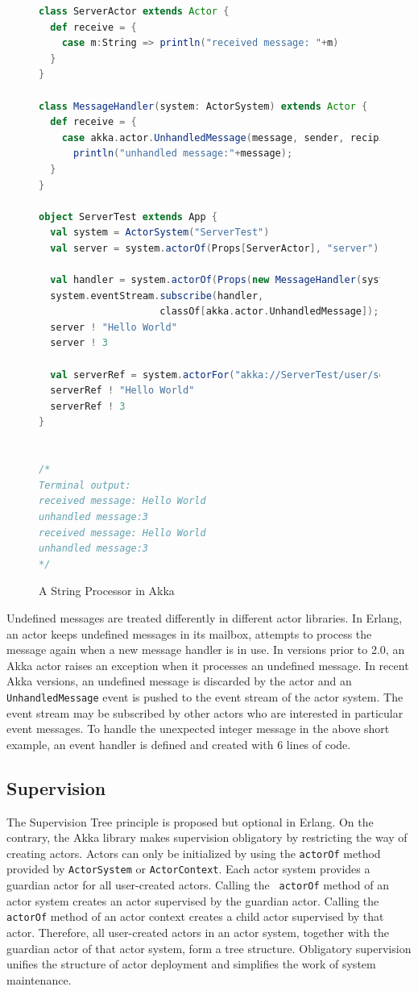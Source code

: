 \begin{figure}[p]
 \label{akkastring}
      \begin{lstlisting}[language=scala]
class ServerActor extends Actor {
  def receive = {
    case m:String => println("received message: "+m)
  }
}

class MessageHandler(system: ActorSystem) extends Actor {
  def receive = {
    case akka.actor.UnhandledMessage(message, sender, recipient) =>
      println("unhandled message:"+message);
  }
}

object ServerTest extends App {
  val system = ActorSystem("ServerTest")
  val server = system.actorOf(Props[ServerActor], "server")
  
  val handler = system.actorOf(Props(new MessageHandler(system)))
  system.eventStream.subscribe(handler,
                     classOf[akka.actor.UnhandledMessage]);
  server ! "Hello World"
  server ! 3
  
  val serverRef = system.actorFor("akka://ServerTest/user/server")
  serverRef ! "Hello World"
  serverRef ! 3
}


/*
Terminal output:
received message: Hello World
unhandled message:3
received message: Hello World
unhandled message:3
*/
    \end{lstlisting}
    \caption{A String Processor in Akka}
\end{figure}

Undefined messages are treated differently in different actor libraries.  In
Erlang, an actor keeps undefined messages in its mailbox, attempts to process
the message again when a new message handler is in use.  In versions prior to
2.0, an Akka actor raises an exception when it processes an undefined message.
In recent Akka versions, an undefined message is discarded by the actor and an
{\tt UnhandledMessage} event is pushed to the event stream of the actor system.
The event stream may be subscribed by other actors who are interested in
particular event messages.  To handle the unexpected integer message in the
above short example, an event handler is defined and created with 6 lines of 
code.


\subsection{Supervision}
\label{akkasup}

The Supervision Tree principle is proposed but optional in Erlang.  On the contrary,
the Akka library makes supervision obligatory by restricting the way of 
creating actors. Actors can only be initialized by using the {\tt actorOf}
method provided by {\tt ActorSystem} or {\tt ActorContext}.  Each actor system
provides a guardian actor for all user-created actors.  Calling the {\tt
actorOf} method of an actor system creates an actor supervised by the 
guardian actor.  Calling the {\tt actorOf} method of an actor context 
creates a child actor supervised by that actor.  Therefore, all user-created  
actors in an actor system, together with the guardian actor of that actor 
system, form a tree structure.  Obligatory supervision unifies the 
structure of actor deployment and simplifies the work of system maintenance.

